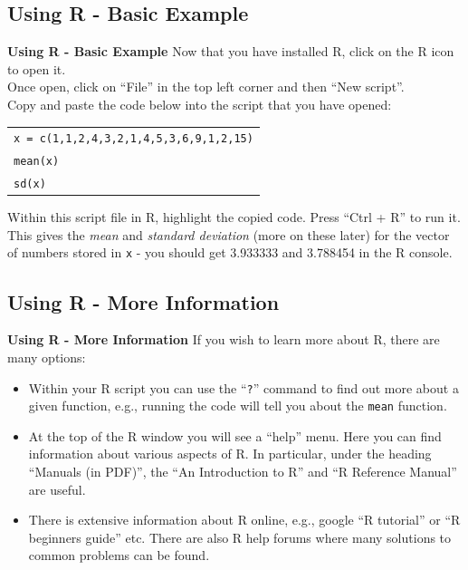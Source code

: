 \documentclass[compress]{beamer}        %
\makeatletter
\newcommand{\tcb}{\textcolor{beamer@blendedblue}}
\makeatother
\begin{document}
\subsection{Using R - Basic Example}
\begin{frame}{\bf \tcb{Using R - Basic Example}}
Now that you have installed R, click on the R icon to open it.\\[0.3cm]
Once open, click on ``File'' in the top left corner and then ``New script''.\\[0.3cm]
Copy and paste the code below into the script that you have opened:\\
\begin{center}
\begin{tabular}{|l|}
\hline
\texttt{x = c(1,1,2,4,3,2,1,4,5,3,6,9,1,2,15)}\\
\texttt{mean(x)}\\
\texttt{sd(x)}\\
\hline
\end{tabular}
\end{center}
Within this script file in R, highlight the copied code. Press ``Ctrl + R'' to run it.\\[0.3cm]
This gives the \emph{mean} and \emph{standard deviation} (more on these later) for the vector of numbers stored in \texttt{x} - you should get 3.933333 and 3.788454 in the R console.
\end{frame}

\subsection{Using R - More Information}
\begin{frame}{\bf \tcb{Using R - More Information}}
If you wish to learn more about R, there are many options:
\begin{itemize}\itemsep0.6cm
\item Within your R script you can use the ``\texttt{?}'' command to find out more about a given function, e.g., running the code  will tell you about the \texttt{mean} function.
\item At the top of the R window you will see a ``help'' menu. Here you can find information about various aspects of R. In particular, under the heading ``Manuals (in PDF)'', the ``An Introduction to R'' and ``R Reference Manual'' are useful.
\item There is extensive information about R online, e.g., google ``R tutorial'' or ``R beginners guide'' etc. There are also R help forums where many solutions to common problems can be found.
\end{itemize}
\end{frame}
\end{document}

